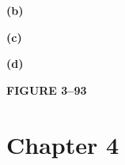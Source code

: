 \documentclass[11pt]{article}
\begin{document}
\begin{enumerate}
\begin{center}
\textbf{(b)}

\vspace{0.12cm}

\hfill


\textbf{(c)}

\vspace{0.12cm}

\hfill


\textbf{(d)}

\vspace{0.08cm}
\textbf{FIGURE 3--93}
\end{center}

\end{enumerate}

\section{Chapter 4}
\end{document}
